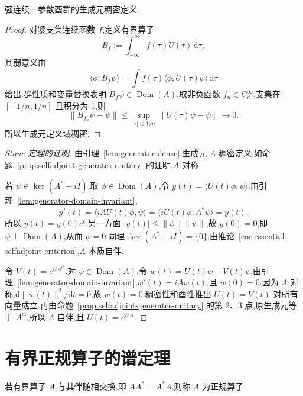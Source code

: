 \begin{lemma}[生成元的稠密定义域]\label{lem:generator-dense}
强连续一参数酉群的生成元稠密定义.
\end{lemma}

\begin{proof}
对紧支集连续函数 \(f\),定义有界算子
\[
B_{f}:=\int_{-\infty}^{\infty}f(\tau)U(\tau)\,\mathrm{d}\tau,
\]
其弱意义由
\[
\langle\phi,B_{f}\psi\rangle
=\int f(\tau)\langle\phi,U(\tau)\psi\rangle\,\mathrm{d}\tau
\]
给出.群性质和变量替换表明 \(B_{f}\psi\in\operatorname{Dom}(A)\).取非负函数 \(f_{n}\in C_{c}^{\infty}\),支集在 \([-1/n,1/n]\) 且积分为 1,则
\[
\|B_{f_{n}}\psi-\psi\|
\leq\sup_{|\tau|\leq1/n}\|U(\tau)\psi-\psi\|\to0.
\]
所以生成元定义域稠密.
\end{proof}

\begin{proof}[Stone 定理的证明]
由引理~\ref{lem:generator-dense},生成元 \(A\) 稠密定义;如命题~\ref{prop:selfadjoint-generates-unitary} 的证明,\(A\) 对称.

若 \(\psi\in\ker(A^{*}-iI)\),取 \(\phi\in\operatorname{Dom}(A)\),令 \(y(t)=\langle U(t)\phi,\psi\rangle\).由引理~\ref{lem:generator-domain-invariant},
\[
y'(t)=\langle iAU(t)\phi,\psi\rangle
=\langle iU(t)\phi,A^{*}\psi\rangle=y(t).
\]
所以 \(y(t)=y(0)e^{t}\).另一方面 \(|y(t)|\leq\|\phi\|\|\psi\|\),故 \(y(0)=0\),即 \(\psi\perp\operatorname{Dom}(A)\),从而 \(\psi=0\).同理 \(\ker(A^{*}+iI)=\{0\}\),由推论~\ref{cor:essential-selfadjoint-criterion},\(A\) 本质自伴.

令 \(V(t)=e^{itA^{\mathrm{cl}}}\).对 \(\psi\in\operatorname{Dom}(A)\),令 \(w(t)=U(t)\psi-V(t)\psi\).由引理~\ref{lem:generator-domain-invariant},\(w'(t)=iAw(t)\),且 \(w(0)=0\).因为 \(A\) 对称,\(\mathrm{d}\|w(t)\|^{2}/\mathrm{d}t=0\),故 \(w(t)=0\).稠密性和酉性推出 \(U(t)=V(t)\) 对所有向量成立.再由命题~\ref{prop:selfadjoint-generates-unitary} 的第 2、3 点,原生成元等于 \(A^{\mathrm{cl}}\),所以 \(A\) 自伴,且 \(U(t)=e^{itA}\).
\end{proof}

\section{有界正规算子的谱定理}
\label{sec:bounded-normal-spectral-theorem}

\begin{definition}[正规算子]\label{def:normal-operator}
若有界算子 \(A\) 与其伴随相交换,即 \(AA^{*}=A^{*}A\),则称 \(A\) 为正规算子.
\end{definition}

